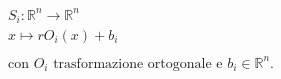 \documentclass[preview]{standalone}
\begin{document}
\begin{align*}
S_i : \mathbb{R}^n \to \mathbb{R}^n \\ x \mapsto r O_i(x) + b_i \\ \\ \text{con } O_i \text{ trasformazione ortogonale e } b_i \in \mathbb{R}^n.
\end{align*}
\end{document}
